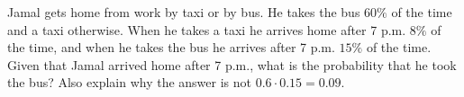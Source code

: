 Jamal gets home from work by taxi or by bus. He takes the bus $60\%$ of the time and a taxi otherwise. When he takes a taxi he arrives home after 7 p.m. $8\%$ of the time, and when he takes the bus he arrives after 7 p.m. $15\%$ of the time. Given that Jamal arrived home after 7 p.m., what is the probability that he took the bus? Also explain why the answer is not $0.6\cdot0.15=0.09$.
